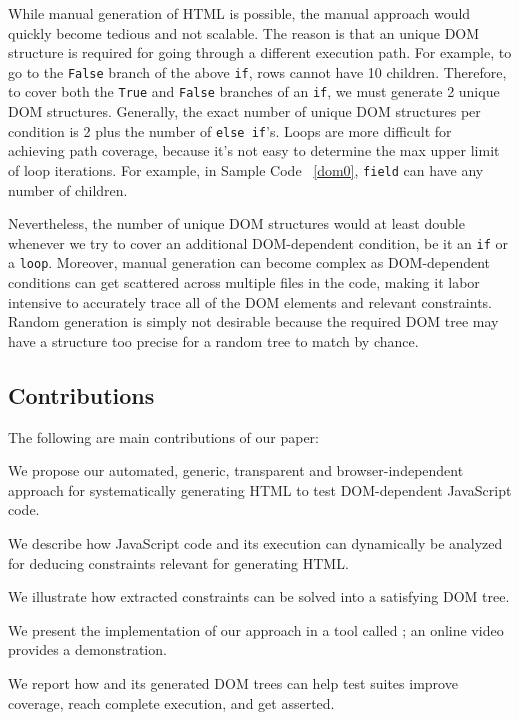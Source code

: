 While manual generation of HTML is possible, the manual approach would quickly become tedious and not scalable.  
The reason is that an unique DOM structure is required for going through a different execution path.
For example, to go to the {\tt False} branch of the above {\tt if}, rows cannot have 10 children.
Therefore, to cover both the {\tt True} and {\tt False} branches of an {\tt if}, we must generate 2 unique DOM structures.  Generally, the exact number of unique DOM structures per condition is 2 plus the number of {\tt else if}'s.  Loops are more difficult for achieving path coverage, because it's not easy to determine the max upper limit of loop iterations.  For example, in Sample Code ~\ref{dom0}, {\tt field} can have any number of children.

Nevertheless, the number of unique DOM structures would at least double whenever we try to cover an additional DOM-dependent condition, be it an {\tt if} or a {\tt loop}.  
Moreover, manual generation can become complex as DOM-dependent conditions can get scattered across multiple files in the code, making it labor intensive to accurately trace all of the DOM elements and relevant constraints.  
Random generation is simply not desirable because the required DOM tree may have a structure too precise for a random tree to match by chance.  

\subsection{Contributions}
The following are main contributions of our paper:
\begin {compactitem}
\item We propose our automated, generic, transparent and browser-independent approach for systematically generating HTML to test DOM-dependent JavaScript code.
\item We describe how JavaScript code and its execution can dynamically be analyzed for deducing constraints relevant for generating HTML.
\item We illustrate how extracted constraints can be solved into a satisfying DOM tree.
\item We present the implementation of our approach in a tool called \tool; an online video provides a demonstration.
\item We report how \tool and its generated DOM trees can help test suites improve coverage, reach complete execution, and get asserted.
\end {compactitem}

